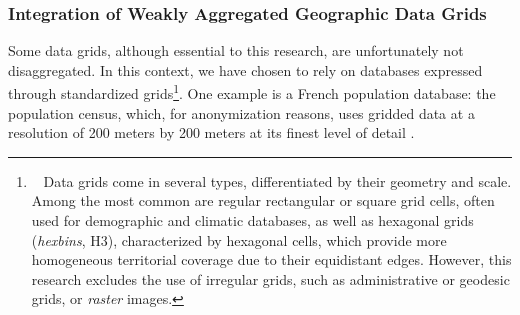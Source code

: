 \begin{refsegment}
\subsubsection*{Integration of Weakly Aggregated Geographic Data Grids
    \label{chap3:quartiers-gare-calcul-carreaux}
    }

Some data grids, although essential to this research, are unfortunately not disaggregated. In this context, we have chosen to rely on databases expressed through standardized grids\footnote{~
    Data grids come in several types, differentiated by their geometry and scale. Among the most common are regular rectangular or square grid cells, often used for demographic and climatic databases, as well as hexagonal grids (\textsl{hexbins}, H3), characterized by hexagonal cells, which provide more homogeneous territorial coverage due to their equidistant edges. However, this research excludes the use of irregular grids, such as administrative or geodesic grids, or \textsl{raster} images.
}. One example is a French population database: the population census, which, for anonymization reasons, uses gridded data at a resolution of 200 meters by 200 meters at its finest level of detail \textcolor{blue}{\autocite{insee_grille_2021}}.%


\end{refsegment}
